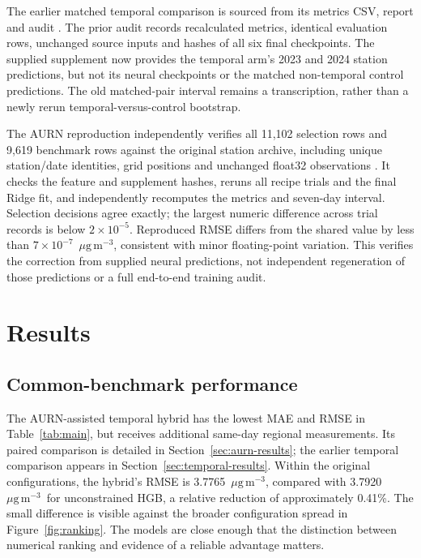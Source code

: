 \documentclass[11pt,a4paper]{article}
\newcommand{\ug}{\ensuremath{\mu\mathrm{g}\,\mathrm{m}^{-3}}}
\begin{document}
The earlier matched temporal comparison is sourced from its metrics CSV, report and
audit \citep{aitkentemporal2026}. The prior audit records recalculated metrics,
identical evaluation rows, unchanged source inputs and hashes of all six final
checkpoints. The supplied supplement now provides the temporal arm's 2023
and 2024 station predictions, but not its neural checkpoints or the matched
non-temporal control predictions. The old matched-pair interval remains a
transcription, rather than a newly rerun temporal-versus-control bootstrap.

The AURN reproduction independently verifies all 11,102 selection rows and
9,619 benchmark rows against the original station archive, including unique
station/date identities, grid positions and unchanged float32 observations
\citep{aitkenaurn2026}. It checks the feature and supplement hashes, reruns
all recipe trials and the final Ridge fit, and independently recomputes the
metrics and seven-day interval. Selection decisions agree exactly; the largest
numeric difference across trial records is below $2\times10^{-5}$. Reproduced
RMSE differs from the shared value by less than $7\times10^{-7}$~\ug,
consistent with minor floating-point variation. This verifies the correction
from supplied neural predictions, not independent regeneration of those
predictions or a full end-to-end training audit.

\section{Results}
\subsection{Common-benchmark performance}
The AURN-assisted temporal hybrid has the lowest MAE and RMSE in
Table~\ref{tab:main}, but receives additional same-day regional measurements.
Its paired comparison is detailed in Section~\ref{sec:aurn-results}; the
earlier temporal comparison appears in Section~\ref{sec:temporal-results}.
Within the original configurations,
the hybrid's RMSE is 3.7765~\ug, compared with
3.7920~\ug\ for unconstrained HGB, a relative reduction of approximately
0.41\%. The small difference is visible against the broader configuration
spread in Figure~\ref{fig:ranking}. The models are close enough that the
distinction between numerical ranking and evidence of a reliable advantage
matters.
\end{document}
